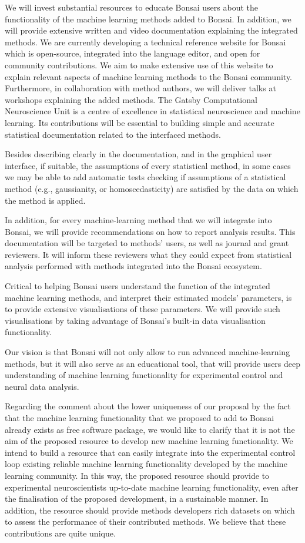 \documentclass[11pt]{letter}
\begin{document}
\begin{letter}{
}
We will invest substantial resources to educate Bonsai users about the
functionality of the machine learning methods added to Bonsai. In addition, we
will provide extensive written and video documentation explaining the
integrated methods. We are currently developing a technical reference  website
for Bonsai which is open-source, integrated into the language editor, and open
for community contributions. We aim to make extensive use of this website to
explain relevant aspects of machine learning methods to the Bonsai community.
Furthermore, in collaboration with method authors, we will deliver talks at
workshops explaining the added methods.
%
The Gatsby Computational Neuroscience Unit is a centre of excellence in
statistical neuroscience and machine learning. Its contributions will be
essential to building simple and accurate statistical documentation related to
the interfaced methods.

Besides describing clearly in the documentation, and in the graphical user
interface, if suitable, the assumptions of every statistical method, in some
cases we may be able to add automatic tests checking if assumptions of a
statistical method (e.g., gaussianity, or homoscedasticity) are satisfied by the
data on which the method is applied.

In addition, for every machine-learning method that we will integrate into
Bonsai, we will provide recommendations on how to report analysis results.
This documentation will be targeted to methods' users, as well as journal and
grant reviewers. It will inform these reviewers what they could expect from
statistical analysis performed with methods integrated into the Bonsai
ecosystem.

Critical to helping Bonsai users understand the function of the integrated
machine learning methods, and interpret their estimated models' parameters, is
to provide extensive visualisations of these parameters. We will provide such
visualisations by taking advantage of Bonsai's built-in data visualisation
functionality.

Our vision is that Bonsai will not only allow to run advanced machine-learning
methods, but it will also serve as an educational tool, that will provide users
deep understanding of machine learning functionality for experimental control
and neural data analysis.

Regarding the comment about the lower uniqueness of our proposal by the fact that
the machine learning functionality that we proposed to add to Bonsai already
exists as free software package, we would like to clarify that it is not the
aim of the proposed resource to develop new machine learning functionality. We
intend to build a resource that can easily integrate into the experimental
control loop existing reliable machine learning functionality developed by the
machine learning community. In this way, the proposed resource should provide to
experimental neuroscientists up-to-date machine learning functionality, even
after the finalisation of the proposed development, in a sustainable manner. In
addition, the resource should provide methods developers rich datasets on which
to assess the performance of their contributed methods.  We believe that these
contributions are quite unique.


\end{letter}
\end{document}
